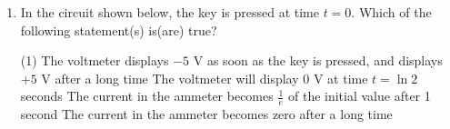 
\begin{enumerate}
    \item In the circuit shown below, the key is pressed at time \( t = 0 \). Which of the following statement(s) is(are) true?
        \begin{tasks}(1)
            \task The voltmeter displays \( -5 \) V as soon as the key is pressed, and displays \( +5 \) V after a long time
            \task The voltmeter will display 0 V at time \( t = \ln 2 \) seconds
            \task The current in the ammeter becomes \( \frac{1}{e} \) of the initial value after 1 second
            \task The current in the ammeter becomes zero after a long time
        \end{tasks}
\end{enumerate}
\begin{center}
\end{center}
